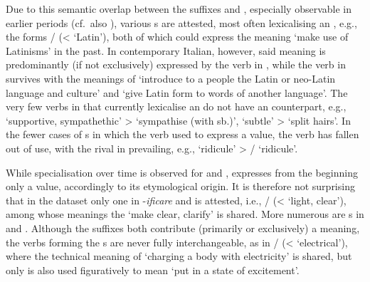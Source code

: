 \documentclass[output=paper,colorlinks,citecolor=brown]{langscibook}
\begin{document}
Due to this semantic overlap between the suffixes  and , especially observable in earlier periods (cf.\ also \citealt{Tronci2019}), various s are attested, most often lexicalising an , e.g., the forms /\mbox{} (<  ‘Latin’), both of which could express the meaning ‘make use of Latinisms’  in the past. In contemporary Italian, however, said meaning is predominantly (if not exclusively) expressed by the verb in , while the verb in  survives with the  meanings of ‘introduce to a people the Latin or neo-Latin language and culture’ and ‘give Latin form to words of another language’. The very few verbs in  that currently lexicalise an  do not have an  counterpart, e.g.,  ‘supportive, sympathethic’ >  ‘sympathise (with sb.)’,  ‘subtle’ >  ‘split hairs’. In the fewer cases of s in which the  verb used to express a  value, the verb has fallen out of use, with the rival in  prevailing, e.g.,  ‘ridicule’ > / ‘ridicule’.

While specialisation over time is observed for  and ,  expresses from the beginning only a  value, accordingly to its etymological origin. It is therefore not surprising that in the dataset only one  in \nobreakdash-\textit{ificare} and  is attested, i.e., / (<  ‘light, clear’), among whose meanings the  ‘make clear, clarify’ is shared.  More numerous are s in  and . Although the suffixes both contribute (primarily or exclusively) a  meaning, the verbs forming the s are never fully interchangeable, as in / (<  ‘electrical’), where the technical meaning of ‘charging a body with electricity’ is shared, but only  is also used figuratively to mean ‘put in a state of excitement’. 
\end{document}
